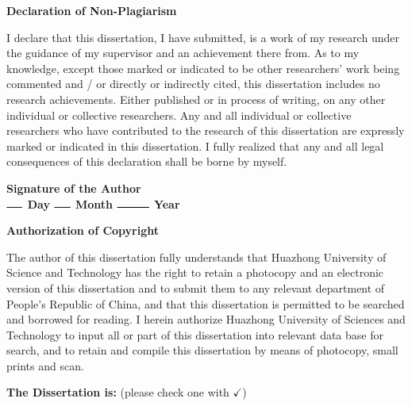 \begin{center}
    \LARGE \bfseries
    Declaration of Non-Plagiarism
\end{center}

\vspace{0.3cm}

I declare that this dissertation, I have submitted, is a work of my research under the guidance of my supervisor and an achievement there from. As to my knowledge, except those marked or indicated to be other researchers’ work being commented and / or directly or indirectly cited, this dissertation includes no research achievements. Either published or in process of writing, on any other individual or collective researchers. Any and all individual or collective researchers who have contributed to the research of this dissertation are expressly marked or indicated in this dissertation. I fully realized that any and all legal consequences of this declaration shall be borne by myself.

\vspace{1cm}

\begin{flushright}
\bfseries
    Signature of the Author \\
    $\rule{0.5cm}{0.3mm}$ Day $\rule{0.5cm}{0.3mm}$ Month  $\rule{1cm}{0.3mm}$ Year
\end{flushright}
    
\vspace{0.1cm}

\begin{center}
    \LARGE \bfseries
    Authorization of Copyright
\end{center}

\vspace{0.3cm}

The author of this dissertation fully understands that Huazhong University of Science and Technology has the right to retain a photocopy and an electronic version of this dissertation and to submit them to any relevant department of People’s Republic of China, and that this dissertation is permitted to be searched and borrowed for reading. I herein authorize Huazhong University of Sciences and Technology to input all or part of this dissertation into relevant data base for search, and to retain and compile this dissertation by means of photocopy, small prints and scan.

\vspace{0.1cm}

\noindent \textbf{The Dissertation is:} (please check one with $\checkmark$)

